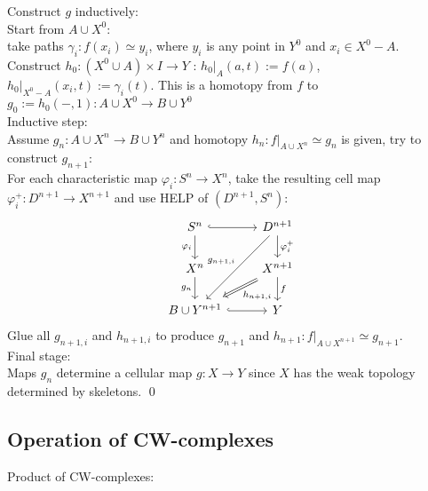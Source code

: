     \begin{prf}
        Construct $g$ inductively:\\
        Start from $A \cup X^0$:\\
        take paths $\gamma_i : f(x_i) \simeq y_i $, where $y_i$ is any point in $Y^0$ and $x_i \in X^0 - A$.\\
        Construct $h_0 : (X^0 \cup A) \times I \to Y $ : $h_0 |_{A} (a,t):= f(a)$,
        $h_0|_{X^0-A} (x_i,t) := \gamma_i(t)$.
        This is a homotopy from $f$ to $g_0 := h_0(-,1) : A\cup X^0 \to B \cup Y^0$\\
        Inductive step:\\
        Assume $g_n : A\cup X^n \to B \cup Y^n$ and homotopy $h_n : f|_{A \cup X^n} \simeq g_n$ is given, try to construct $g_{n+1}$:\\
        For each characteristic map $\varphi_i : S^n \to X^n$, take the resulting cell map $\varphi^+_i : D^{n+1} \to X^{n+1}$ 
        and use HELP of $(D^{n+1}, S^n)$:
        \[\begin{tikzcd}
            {S^n} & {D^{n+1}} \\
            {X^n} & {X^{n+1}} \\
            {B\cup Y^{n+1}} & Y
            \arrow[hook, from=1-1, to=1-2]
            \arrow["{\varphi_i}"', from=1-1, to=2-1]
            \arrow["{g_n}"', from=2-1, to=3-1]
            \arrow[hook, from=3-1, to=3-2]
            \arrow["{\varphi^+_i}", from=1-2, to=2-2]
            \arrow["f", from=2-2, to=3-2]
            \arrow["{g_{n+1,i}}"', from=1-2, to=3-1]
            \arrow["{h_{n+1,i}}", shorten <=4pt, shorten >=4pt, Rightarrow, from=2-2, to=3-1]
        \end{tikzcd}\]
        Glue all $g_{n+1,i}$ and $ h_{n+1,i}$ to produce $g_{n+1}$ and $h_{n+1} : f|_{A \cup X^{n+1}} \simeq g_{n+1}$.\\
        Final stage:\\
        Maps $g_n$ determine a cellular map $g : X \to Y$ since $X$ has the weak topology determined by skeletons.
        \qed
    \end{prf}

    \subsection{Operation of CW-complexes}

    Product of CW-complexes:

